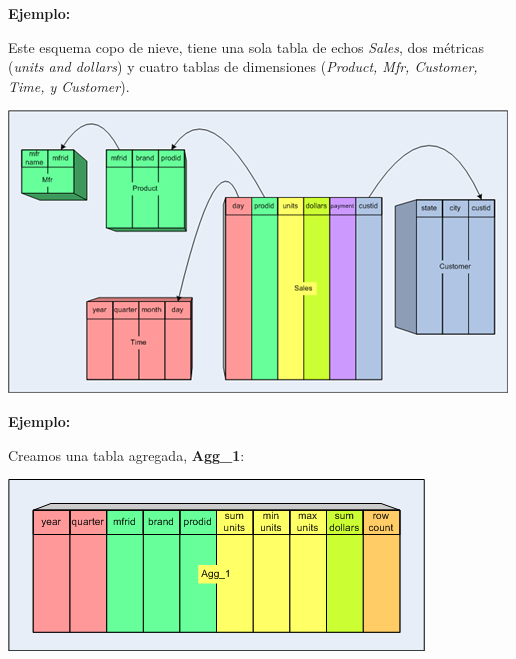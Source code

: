 \documentclass{fancyslides}
\begin{document}
\begin{frame}
\misc
{
\textbf{Ejemplo:}

Este esquema copo de nieve, tiene una sola tabla de echos \textit{Sales}, dos métricas (\textit{units and dollars}) y cuatro tablas de dimensiones (\textit{Product, Mfr, Customer, Time, y Customer}).

\begin{center}
\includegraphics[scale=0.4]{aggregate_tables_1}
\end{center}
}
\end{frame}

\begin{frame}
\misc
{
\textbf{Ejemplo:}

Creamos una tabla agregada, \textbf{Agg\_1}:
 
\begin{center}
\includegraphics[scale=0.5]{aggregate_tables_2}
\end{center}
}
\end{frame}
\end{document}
